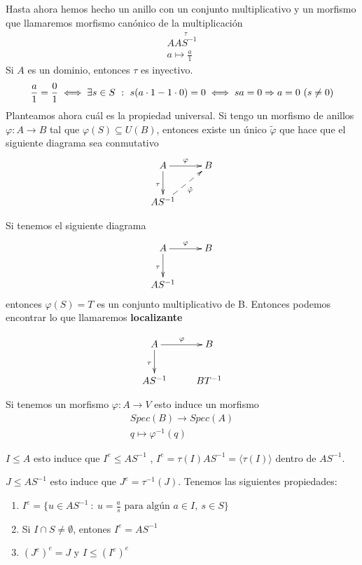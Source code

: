 Hasta ahora hemos hecho un anillo con un conjunto multiplicativo y un morfismo que llamaremos morfismo canónico de la multiplicación
\begin{gather*}
    A \overset{\tau}{AS^{-1}}\\
    a \mapsto \frac{a}{1}
\end{gather*}
Si $A$ es un dominio, entonces $\tau$ es inyectivo.
\begin{gather*}
    \frac{a}{1} = \frac{0}{1} \iff \exists s \in S \ : \ s(a \cdot 1 - 1 \cdot 0) = 0 \iff sa=0 \Rightarrow a=0\ (s\neq 0)
\end{gather*}
Planteamos ahora cuál es la propiedad universal. Si tengo un morfismo de anillos $\varphi: A \to B$ tal que $\varphi(S) \subseteq U(B)$, entonces existe un único $\tilde{\varphi}$ que hace que el siguiente diagrama sea conmutativo
\begin{gather*}
    \xymatrix{
        A \ar[d]_{\tau} \ar[r]^{\varphi} & B\\
        AS^{-1} \ar@{-->}[ru]_{\tilde{\varphi}}
    }
\end{gather*}

Si tenemos el siguiente diagrama
\begin{gather*}
    \xymatrix{
        A \ar[d]_{\tau} \ar[r]^{\varphi} & B\\
        AS^{-1}
    }
\end{gather*}
entonces $\varphi(S)=T$ es un conjunto multiplicativo de B. Entonces podemos encontrar lo que llamaremos \textbf{localizante}

\begin{gather*}
    \xymatrix{
        A \ar[d]_{\tau} \ar[r]^{\varphi} & B\\
        AS^{-1} & BT^{-1}
    }
\end{gather*}

Si tenemos un morfismo $\varphi: A \to V$ esto induce un morfismo 
\begin{gather*}
    Spec(B) \to Spec(A)\\
    q \mapsto \varphi^{-1}(q)
\end{gather*}

$I \leq A$ esto induce que $I^e \leq AS^{-1}$ , $I^e = \tau(I)AS^{-1} = \langle \tau(I) \rangle$ dentro de $AS^{-1}$.

$J\leq AS^{-1}$ esto induce que $J^{e}=\tau^{-1}(J)$. Tenemos las siguientes propiedades:
\begin{enumerate}
    \item $I^e = \{u\in AS^{-1} \ : \ u = \frac{a}{s} \text{ para algún } a\in I,\ s \in S\}$
    \item Si $I\cap S\neq \emptyset $, entones $I^e = AS^{-1}$
    \item $(J^e)^e = J$ y $I \leq (I^e)^e$
\end{enumerate}

